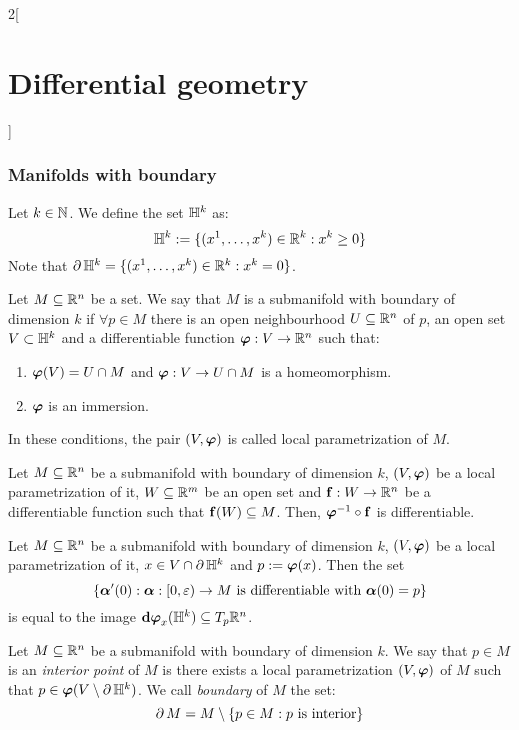 \documentclass[../../../main.tex]{subfiles}
\begin{document}
\begin{multicols}{2}[\section{Differential geometry}]
  \subsubsection{Manifolds with boundary}
  \begin{definition}
    Let $k\in\mathbb{N}$. We define the set $\mathbb{H}^k$ as: $$\mathbb{H}^k:=\{(x^1,\ldots,x^k)\in\mathbb{R}^k:x^k\geq 0\}$$
    Note that $\operatorname{\partial}{\mathbb{H}^k}=\{(x^1,\ldots,x^k)\in\mathbb{R}^k:x^k=0\}$.
  \end{definition}
  \begin{definition}
    Let $M\subseteq\mathbb{R}^n$ be a set. We say that $M$ is a submanifold with boundary of dimension $k$ if $\forall p\in M$ there is an open neighbourhood $U\subseteq\mathbb{R}^n$ of $p$, an open set $V\subset \mathbb{H}^k$ and a differentiable function $\boldsymbol{\mathrm{\varphi}}:V\rightarrow\mathbb{R}^n$ such that:
    \begin{enumerate}
      \item $\boldsymbol{\mathrm{\varphi}}(V)=U\cap M$ and $\boldsymbol{\mathrm{\varphi}}:V\rightarrow U\cap M$ is a homeomorphism.
      \item $\boldsymbol{\mathrm{\varphi}}$ is an immersion.
    \end{enumerate}
    In these conditions, the pair $(V,\boldsymbol{\mathrm{\varphi}})$ is called local parametrization of $M$.
  \end{definition}
  \begin{proposition}
    Let $M\subseteq\mathbb{R}^n$ be a submanifold with boundary of dimension $k$, $(V,\boldsymbol{\mathrm{\varphi}})$ be a local parametrization of it, $W\subseteq \mathbb{R}^m$ be an open set and $\boldsymbol{\mathrm{f}}:W\rightarrow\mathbb{R}^n$ be a differentiable function such that $\boldsymbol{\mathrm{f}}(W)\subseteq M$. Then, ${\boldsymbol{\mathrm{\varphi}}}^{-1}\circ\boldsymbol{\mathrm{f}}$ is differentiable.
  \end{proposition}
  \begin{lemma}
    Let $M\subseteq\mathbb{R}^n$ be a submanifold with boundary of dimension $k$, $(V,\boldsymbol{\mathrm{\varphi}})$ be a local parametrization of it, $x\in V\cap \operatorname{\partial}{\mathbb{H}^k}$ and $p:=\boldsymbol{\mathrm{\varphi}}(x)$. Then the set $$\{\boldsymbol{\mathrm{\alpha}}'(0):\boldsymbol{\mathrm{\alpha}}:[0,\varepsilon)\rightarrow M\text{ is differentiable with }\boldsymbol{\mathrm{\alpha}}(0)=p\}$$ is equal to the image $\boldsymbol{\mathrm{\dd}}\boldsymbol{\mathrm{\varphi}}_x(\mathbb{H}^k)\subseteq T_p\mathbb{R}^n$.
  \end{lemma}
  \begin{definition}
    Let $M\subseteq\mathbb{R}^n$ be a submanifold with boundary of dimension $k$. We say that $p\in M$ is an \emph{interior point} of $M$ is there exists a local parametrization $(V,\boldsymbol{\mathrm{\varphi}})$ of $M$ such that $p\in\boldsymbol{\mathrm{\varphi}}(V\setminus\operatorname{\partial}{\mathbb{H}^k})$. We call \emph{boundary} of $M$ the set: $$\operatorname{\partial}{M}=M\setminus\{p\in M:p\text{ is interior}\}$$

\end{definition}
\end{multicols}
\end{document}
